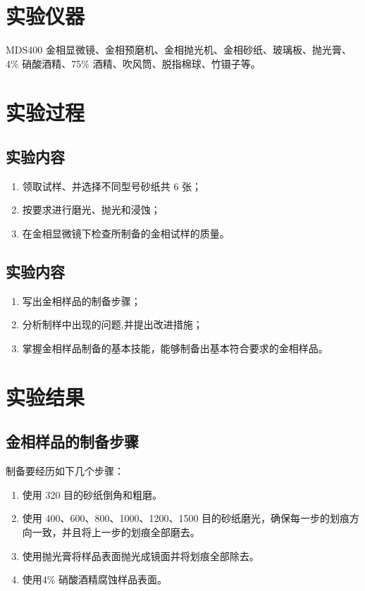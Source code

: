 \section{实验仪器}%
    MDS400 金相显微镜、金相预磨机、金相抛光机、金相砂纸、玻璃板、抛光膏、4\% 硝酸酒精、75\% 酒精、吹风筒、脱指棉球、竹镊子等。
\section{实验过程}%
    \subsection{实验内容}
        \begin{enumerate}
            \item 领取试样、并选择不同型号砂纸共 6 张；
            \item 按要求进行磨光、抛光和浸蚀；
            \item 在金相显微镜下检查所制备的金相试样的质量。
        \end{enumerate}
    \subsection{实验内容}
        \begin{enumerate}
            \item 写出金相样品的制备步骤；
            \item 分析制样中出现的问题,并提出改进措施；
            \item 掌握金相样品制备的基本技能，能够制备出基本符合要求的金相样品。
        \end{enumerate}
\section{实验结果}
    \subsection{金相样品的制备步骤}
        制备要经历如下几个步骤：
        \begin{enumerate}
            \item 使用 320 目的砂纸倒角和粗磨。
            \item 使用 400、600、800、1000、1200、1500 目的砂纸磨光，确保每一步的划痕方向一致，并且将上一步的划痕全部磨去。
            \item 使用抛光膏将样品表面抛光成镜面并将划痕全部除去。
            \item 使用4\% 硝酸酒精腐蚀样品表面。
        \end{enumerate}
